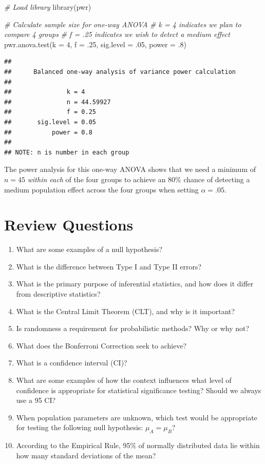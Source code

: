 \documentclass[
]{book}
\newenvironment{Shaded}{\begin{snugshade}}{\end{snugshade}}
\newcommand{\AttributeTok}[1]{\textcolor[rgb]{0.77,0.63,0.00}{#1}}
\newcommand{\CommentTok}[1]{\textcolor[rgb]{0.56,0.35,0.01}{\textit{#1}}}
\newcommand{\DecValTok}[1]{\textcolor[rgb]{0.00,0.00,0.81}{#1}}
\newcommand{\FunctionTok}[1]{\textcolor[rgb]{0.00,0.00,0.00}{#1}}
\newcommand{\NormalTok}[1]{#1}
\begin{document}
\begin{Shaded}
\begin{Highlighting}[]
\CommentTok{\# Load library}
\FunctionTok{library}\NormalTok{(pwr)}

\CommentTok{\# Calculate sample size for one{-}way ANOVA}
\CommentTok{\# k = 4 indicates we plan to compare 4 groups}
\CommentTok{\# f = .25 indicates we wish to detect a medium effect}
\FunctionTok{pwr.anova.test}\NormalTok{(}\AttributeTok{k =} \DecValTok{4}\NormalTok{, }\AttributeTok{f =}\NormalTok{ .}\DecValTok{25}\NormalTok{, }\AttributeTok{sig.level =}\NormalTok{ .}\DecValTok{05}\NormalTok{, }\AttributeTok{power =}\NormalTok{ .}\DecValTok{8}\NormalTok{)}
\end{Highlighting}
\end{Shaded}

\begin{verbatim}
## 
##      Balanced one-way analysis of variance power calculation 
## 
##               k = 4
##               n = 44.59927
##               f = 0.25
##       sig.level = 0.05
##           power = 0.8
## 
## NOTE: n is number in each group
\end{verbatim}

The power analysis for this one-way ANOVA shows that we need a minimum of \(n = 45\) \emph{within each} of the four groups to achieve an 80\% chance of detecting a medium population effect across the four groups when setting \(\alpha = .05\).

\hypertarget{review-questions-6}{%
\section{Review Questions}\label{review-questions-6}}

\begin{enumerate}
\def\labelenumi{\arabic{enumi}.}
\item
  What are some examples of a null hypothesis?
\item
  What is the difference between Type I and Type II errors?
\item
  What is the primary purpose of inferential statistics, and how does it differ from descriptive statistics?
\item
  What is the Central Limit Theorem (CLT), and why is it important?
\item
  Is randomness a requirement for probabilistic methods? Why or why not?
\item
  What does the Bonferroni Correction seek to achieve?
\item
  What is a confidence interval (CI)?
\item
  What are some examples of how the context influences what level of confidence is appropriate for statistical significance testing? Should we always use a 95 CI?
\item
  When population parameters are unknown, which test would be appropriate for testing the following null hypothesis: \(\mu_A = \mu_B\)?
\item
  According to the Empirical Rule, 95\% of normally distributed data lie within how many standard deviations of the mean?
\end{enumerate}
\end{document}
